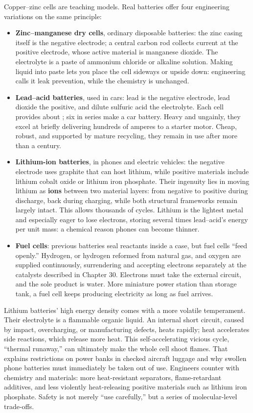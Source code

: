 Copper--zinc cells are teaching models. Real batteries offer four engineering variations on the same principle:

\begin{itemize}[itemsep=2pt]
\item \textbf{Zinc--manganese dry cells}, ordinary disposable batteries: the zinc casing itself is the negative electrode; a central carbon rod collects current at the positive electrode, whose active material is manganese dioxide. The electrolyte is a paste of ammonium chloride or alkaline solution. Making liquid into paste lets you place the cell sideways or upside down: engineering calls it leak prevention, while the chemistry is unchanged.
\item \textbf{Lead--acid batteries}, used in cars: lead is the negative electrode, lead dioxide the positive, and dilute sulfuric acid the electrolyte. Each cell provides about ; six in series make a  car battery. Heavy and ungainly, they excel at briefly delivering hundreds of amperes to a starter motor. Cheap, robust, and supported by mature recycling, they remain in use after more than a century.
\item \textbf{Lithium-ion batteries}, in phones and electric vehicles: the negative electrode uses graphite that can host lithium, while positive materials include lithium cobalt oxide or lithium iron phosphate. Their ingenuity lies in moving lithium as \textbf{ions} between two material layers: from negative to positive during discharge, back during charging, while both structural frameworks remain largely intact. This allows thousands of cycles. Lithium is the lightest metal and especially eager to lose electrons, storing several times lead--acid's energy per unit mass: a chemical reason phones can become thinner.
\item \textbf{Fuel cells}: previous batteries seal reactants inside a case, but fuel cells ``feed openly.'' Hydrogen, or hydrogen reformed from natural gas, and oxygen are supplied continuously, surrendering and accepting electrons separately at the catalysts described in Chapter 30. Electrons must take the external circuit, and the sole product is water. More miniature power station than storage tank, a fuel cell keeps producing electricity as long as fuel arrives.
\end{itemize}

Lithium batteries' high energy density comes with a more volatile temperament. Their electrolyte is a flammable organic liquid. An internal short circuit, caused by impact, overcharging, or manufacturing defects, heats rapidly; heat accelerates side reactions, which release more heat. This self-accelerating vicious cycle, ``thermal runaway,'' can ultimately make the whole cell shoot flames. That explains restrictions on power banks in checked aircraft luggage and why swollen phone batteries must immediately be taken out of use. Engineers counter with chemistry and materials: more heat-resistant separators, flame-retardant additives, and less violently heat-releasing positive materials such as lithium iron phosphate. Safety is not merely ``use carefully,'' but a series of molecular-level trade-offs.

